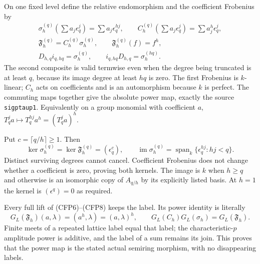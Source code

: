 On one fixed level define the relative endomorphism
and the coefficient Frobenius by
\begin{equation}\tag{CFP7}
\begin{gathered}
 \sigma_h^{(q)}(\sum a_j\epsilon_q^j)
                     =\sum a_j\epsilon_q^{hj},\qquad
 C_h^{(q)}(\sum a_j\epsilon_q^j)
                     =\sum a_j^h\epsilon_q^j,\\
 \mathfrak F_h^{(q)}=C_h^{(q)}\sigma_h^{(q)},\qquad
               \mathfrak F_h^{(q)}(f)=f^h,\\
 D_{h,q}i_{q,hq}=\sigma_h^{(q)},\qquad
 i_{q,hq}D_{h,q}=\sigma_h^{(hq)}.
\end{gathered}
\end{equation}
The second composite is valid termwise even when the
degree being truncated is at least $q$, because its
image degree at least $hq$ is zero. The first
Frobenius is $k$-linear; $C_h$ acts on coefficients
and is an automorphism because $k$ is perfect.
The commuting maps together give the absolute power
map, exactly the source \texttt{sigptaup1}.
Equivalently on a group monomial with coefficient $a$,
$T_q^j a\mapsto T_q^{hj}a^h=(T_q^ja)^h$.

Put $c=\lceil q/h\rceil\ge1$. Then
\begin{equation}\tag{CFP8}
 \ker\sigma_h^{(q)}=\ker\mathfrak F_h^{(q)}
      =(\epsilon_q^c),\qquad
 \operatorname{im}\sigma_h^{(q)}
      =\operatorname{span}_k\{\epsilon_q^{hj}:hj<q\}.
\end{equation}
Distinct surviving degrees cannot cancel. Coefficient
Frobenius does not change whether a coefficient is
zero, proving both kernels. The image is $k$ when
$h\ge q$ and otherwise is an isomorphic copy of
$A_{q/h}$ by its explicitly listed basis. At $h=1$
the kernel is $(\epsilon^q)=0$ as required.

Every full lift of (CFP6)--(CFP8) keeps the label.
Its power identity is literally
\begin{equation}\tag{CFP9}
 G_L(\mathfrak F_h)(a,\lambda)
       =(a^h,\lambda)=(a,\lambda)^h,
 \qquad
 G_L(C_h)G_L(\sigma_h)=G_L(\mathfrak F_h).
\end{equation}
Finite meets of a repeated lattice label equal that
label; the characteristic-$p$ amplitude power is
additive, and the label of a sum remains its join.
This proves that the power map is the stated actual
semiring morphism, with no disappearing labels.


